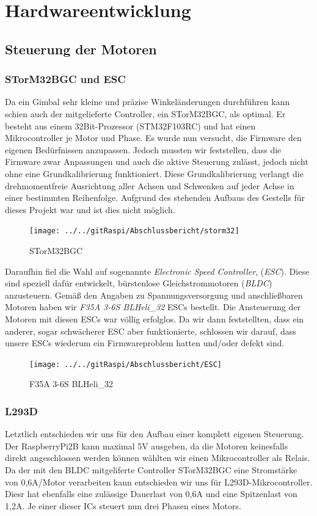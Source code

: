 \documentclass[12pt,a4paper,bibliography=totocnumbered,listof=totocnumbered]{scrartcl}
\begin{document}
\section{Hardwareentwicklung}
\subsection{Steuerung der Motoren}
\subsubsection{STorM32BGC und ESC}
Da ein Gimbal sehr kleine und präzise Winkeländerungen durchführen kann schien auch der mitgelieferte Controller, ein STorM32BGC, als optimal. Er besteht aus einem 32Bit-Prozessor (STM32F103RC) und hat einen Mikrocontroller je Motor und Phase. Es wurde nun versucht, die Firmware den eigenen Bedürfnissen anzupassen. Jedoch mussten wir feststellen, dass die Firmware zwar Anpassungen und auch die aktive Steuerung zulässt, jedoch nicht ohne eine Grundkalibrierung funktioniert. Diese Grundkalibrierung verlangt die drehmomentfreie Ausrichtung aller Achsen und Schwenken auf jeder Achse in einer bestimmten Reihenfolge. Aufgrund des stehenden Aufbaus des Gestells für dieses Projekt war und ist dies nicht möglich.

\begin{figure}[th]
	\centering
	\texttt{[image: ../../gitRaspi/Abschlussbericht/storm32]}
	\caption{STorM32BGC}
	\label{fig:storm32}
\end{figure}

Daraufhin fiel die Wahl auf sogenannte \textit{Electronic Speed Controller}, (\textit{ESC}). Diese sind speziell dafür entwickelt, bürstenlose Gleichstrommotoren (\textit{BLDC}) anzusteuern. Gemäß den Angaben zu Spannungsversorgung und anschließbaren Motoren haben wir \textit{F35A 3-6S BLHeli\_32} ESCs bestellt. Die Ansteuerung der Motoren mit diesen ESCs war völlig erfolglos. Da wir dann feststellten, dass ein anderer, sogar schwächerer ESC aber funktionierte, schlossen wir darauf, dass unsere ESCs wiederum ein Firmwareproblem hatten und/oder defekt sind.

\begin{figure}[th]
	\centering
	\texttt{[image: ../../gitRaspi/Abschlussbericht/ESC]}
	\caption{F35A 3-6S BLHeli\_32}
	\label{fig:esc}
\end{figure}


\subsubsection{L293D}
Letztlich entschieden wir uns für den Aufbau einer komplett eigenen Steuerung. Der RaspberryPi2B kann maximal 5V ausgeben, da die Motoren keinesfalls direkt angeschlossen werden können wählten wir einen Mikrocontroller als Relais. Da der mit den BLDC mitgeliferte Controller STorM32BGC eine Stromstärke von 0,6A/Motor verarbeiten kann entschieden wir uns für L293D-Mikrocontroller. Diesr hat ebenfalls eine zulässige Dauerlast von 0,6A und eine Spitzenlast von 1,2A. Je einer dieser ICs steuert nun drei Phasen eines Motors.
\end{document}
